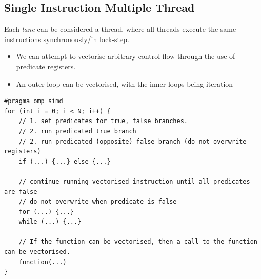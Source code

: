 \subsection{Single Instruction Multiple Thread}
Each \textit{lane} can be considered a thread, where all threads execute the same instructions synchronously/in lock-step.
\begin{itemize}
    \item We can attempt to vectorise arbitrary control flow through the use of predicate registers.
    \item An outer loop can be vectorised, with the inner loops being iteration
\end{itemize}
\begin{verbatim}
#pragma omp simd
for (int i = 0; i < N; i++) {
    // 1. set predicates for true, false branches.
    // 2. run predicated true branch
    // 2. run predicated (opposite) false branch (do not overwrite registers)
    if (...) {...} else {...}

    // continue running vectorised instruction until all predicates are false
    // do not overwrite when predicate is false
    for (...) {...}
    while (...) {...}

    // If the function can be vectorised, then a call to the function can be vectorised.
    function(...)
}
\end{verbatim}

